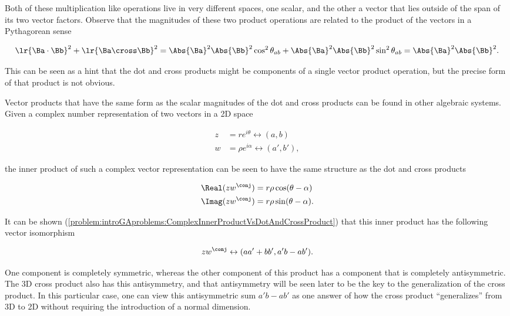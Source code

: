 Both of these multiplication like operations live in very different spaces, one scalar, and the other a vector that lies outside of the span of its two vector factors.  Observe that the magnitudes of these two product operations are related to the product of the vectors in a Pythagorean sense

\begin{dmath}\label{eqn:GAmotivation:180}
\lr{ \Ba \cdot \Bb }^2 + \lr{ \Ba \cross \Bb }^2
=
\Abs{\Ba}^2 \Abs{\Bb}^2 \cos^2 \theta_{ab}
+\Abs{\Ba}^2 \Abs{\Bb}^2 \sin^2 \theta_{ab}
=
\Abs{\Ba}^2 \Abs{\Bb}^2.
\end{dmath}

This can be seen as a hint that the dot and cross products might be components of a single vector product operation, but the precise form of that product is not obvious.

Vector products that have the same form as the scalar magnitudes of the dot and cross products can be found in other algebraic systems.  Given a complex number representation of two vectors in a 2D space

\begin{dmath}\label{eqn:GAmotivation:200}
\begin{aligned}
z &= r e^{i \theta} \leftrightarrow (a, b) \\
w &= \rho e^{i \alpha} \leftrightarrow (a', b'),
\end{aligned}
\end{dmath}

the inner product of such a complex vector representation can be seen to have the same structure as the dot and cross products

\begin{equation}\label{eqn:GAmotivation:100}
\begin{aligned}
\Real( z w^\conj ) &= r \rho \cos(\theta - \alpha) \\
\Imag( z w^\conj ) &= r \rho \sin(\theta - \alpha).
\end{aligned}
\end{equation}

It can be shown
(\cref{problem:introGAproblems:ComplexInnerProductVsDotAndCrossProduct})
that this inner product has the following vector isomorphism

\begin{dmath}\label{eqn:GAmotivation:220}
z w^\conj \leftrightarrow ( a a' + b b', a' b - a b' ).
\end{dmath}

One component is completely symmetric, whereas the other component of this product has a component that is completely antisymmetric.
The 3D cross product also has this antisymmetry, and that antisymmetry will be seen later to be the key to the generalization of the cross product.  In this particular case, one can view this antisymmetric sum \( a' b - a b' \) as one
answer of how the cross product ``generalizes'' from 3D to 2D without requiring the introduction of a normal dimension.


